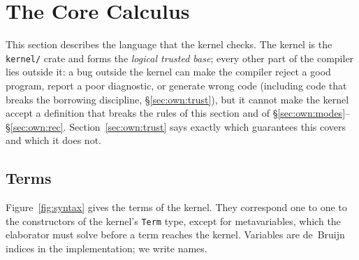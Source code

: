 \section{The Core Calculus}\label{sec:core}

This section describes the language that the kernel checks.
The kernel is the \texttt{kernel/} crate and forms the \emph{logical trusted base}; every other part of the compiler lies outside it: a bug outside the kernel can make the compiler reject a good program, report a poor diagnostic, or generate wrong code (including code that breaks the borrowing discipline, \S\ref{sec:own:trust}), but it cannot make the kernel accept a definition that breaks the rules of this section and of \S\ref{sec:own:modes}--\S\ref{sec:own:rec}.
Section~\ref{sec:own:trust} says exactly which guarantees this covers and which it does not.

\subsection{Terms}\label{sec:core:terms}

Figure~\ref{fig:syntax} gives the terms of the kernel.
They correspond one to one to the constructors of the kernel's \texttt{Term} type, except for metavariables, which the elaborator must solve before a term reaches the kernel.
Variables are de~Bruijn indices in the implementation; we write names.

